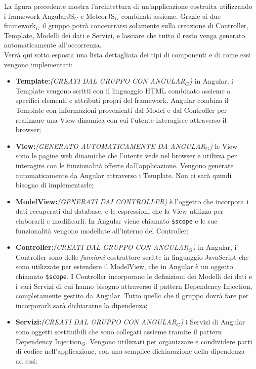 La figura precedente mostra l'architettura di un'applicazione costruita utilizzando i framework AngularJS$_G$ e MeteorJS$_G$ combinati assieme. Grazie ai due framework$_G$ il gruppo potrà concentrarsi solamente sulla creazione di Controller, Template, Modelli dei dati e Servizi, e lasciare che tutto il resto venga generato automaticamente all'occorrenza. \\
Verrà qui sotto esposta una lista dettagliata dei tipi di componenti e di come essi vengono implementati:
\begin{itemize}
\item \textbf{Template:}\textit{(CREATI DAL GRUPPO CON ANGULAR$_G$)} in Angular, i Template vengono scritti con il linguaggio HTML combinato assieme a specifici elementi e attributi propri del framework. Angular combina il Template con informazioni provenienti dal Model e dal Controller per realizzare una View dinamica con cui l'utente interagisce attraverso il browser;
\item \textbf{View:}\textit{(GENERATO AUTOMATICAMENTE DA ANGULAR$_G$)} le View sono le pagine web dinamiche che l'utente vede nel browser e utilizza per interagire con le funzionalità offerte dall'applicazione. Vengono generate automaticamente da Angular attraverso i Template. Non ci sarà quindi bisogno di implementarle;
\item \textbf{ModelView:}\textit{(GENERATI DAI CONTROLLER)} è l'oggetto che incorpora i dati recuperati dal database, e le espressioni che la View utilizza per elaborarli e modificarli. In Angular viene chiamato \texttt{\$scope} e le sue funzionalità vengono modellate all'interno del Controller; 
\item \textbf{Controller:}\textit{(CREATI DAL GRUPPO CON ANGULAR$_G$)} in Angular, i Controller sono delle \textit{funzioni} costruttore scritte in linguaggio JavaScript che sono utilizzate per estendere il ModelView, che in Angular è un oggetto chiamato \texttt{\$scope}. I Controller incorporano le definizioni dei Modelli dei dati e i vari Servizi di cui hanno bisogno attraverso il pattern Dependency Injection, completamente gestito da Angular. Tutto quello che il gruppo dovrà fare per incorporarli sarà dichiararne la dipendenza;
\item \textbf{Servizi:}\textit{(CREATI DAL GRUPPO CON ANGULAR$_G$)} i Servizi di Angular sono oggetti sostituibili che sono collegati assieme tramite il pattern Dependency Injection$_G$. Vengono utilizzati per organizzare e condividere parti di codice nell'applicazione, con una semplice dichiarazione della dipendenza ad essi;

\end{itemize}
